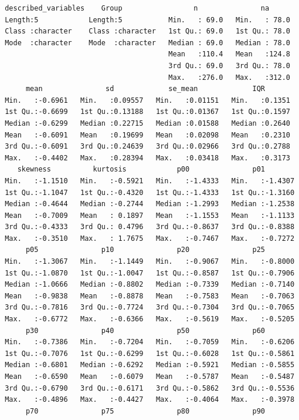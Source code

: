 \documentclass[
  letterpaper,
  DIV=11,
  numbers=noendperiod]{scrreprt}
\begin{document}
\begin{verbatim}
 described_variables    Group                 n               na       
 Length:5            Length:5           Min.   : 69.0   Min.   : 78.0  
 Class :character    Class :character   1st Qu.: 69.0   1st Qu.: 78.0  
 Mode  :character    Mode  :character   Median : 69.0   Median : 78.0  
                                        Mean   :110.4   Mean   :124.8  
                                        3rd Qu.: 69.0   3rd Qu.: 78.0  
                                        Max.   :276.0   Max.   :312.0  
      mean               sd             se_mean             IQR        
 Min.   :-0.6961   Min.   :0.09557   Min.   :0.01151   Min.   :0.1351  
 1st Qu.:-0.6699   1st Qu.:0.13188   1st Qu.:0.01367   1st Qu.:0.1597  
 Median :-0.6299   Median :0.22715   Median :0.01588   Median :0.2640  
 Mean   :-0.6091   Mean   :0.19699   Mean   :0.02098   Mean   :0.2310  
 3rd Qu.:-0.6091   3rd Qu.:0.24639   3rd Qu.:0.02966   3rd Qu.:0.2788  
 Max.   :-0.4402   Max.   :0.28394   Max.   :0.03418   Max.   :0.3173  
    skewness          kurtosis            p00               p01         
 Min.   :-1.1510   Min.   :-0.5921   Min.   :-1.4333   Min.   :-1.4307  
 1st Qu.:-1.1047   1st Qu.:-0.4320   1st Qu.:-1.4333   1st Qu.:-1.3160  
 Median :-0.4644   Median :-0.2744   Median :-1.2993   Median :-1.2538  
 Mean   :-0.7009   Mean   : 0.1897   Mean   :-1.1553   Mean   :-1.1133  
 3rd Qu.:-0.4333   3rd Qu.: 0.4796   3rd Qu.:-0.8637   3rd Qu.:-0.8388  
 Max.   :-0.3510   Max.   : 1.7675   Max.   :-0.7467   Max.   :-0.7272  
      p05               p10               p20               p25         
 Min.   :-1.3067   Min.   :-1.1449   Min.   :-0.9067   Min.   :-0.8000  
 1st Qu.:-1.0870   1st Qu.:-1.0047   1st Qu.:-0.8587   1st Qu.:-0.7906  
 Median :-1.0666   Median :-0.8802   Median :-0.7339   Median :-0.7140  
 Mean   :-0.9838   Mean   :-0.8878   Mean   :-0.7583   Mean   :-0.7063  
 3rd Qu.:-0.7816   3rd Qu.:-0.7724   3rd Qu.:-0.7304   3rd Qu.:-0.7065  
 Max.   :-0.6772   Max.   :-0.6366   Max.   :-0.5619   Max.   :-0.5205  
      p30               p40               p50               p60         
 Min.   :-0.7386   Min.   :-0.7204   Min.   :-0.7059   Min.   :-0.6206  
 1st Qu.:-0.7076   1st Qu.:-0.6299   1st Qu.:-0.6028   1st Qu.:-0.5861  
 Median :-0.6801   Median :-0.6292   Median :-0.5921   Median :-0.5855  
 Mean   :-0.6590   Mean   :-0.6079   Mean   :-0.5787   Mean   :-0.5487  
 3rd Qu.:-0.6790   3rd Qu.:-0.6171   3rd Qu.:-0.5862   3rd Qu.:-0.5536  
 Max.   :-0.4896   Max.   :-0.4427   Max.   :-0.4064   Max.   :-0.3978  
      p70               p75               p80               p90         

\end{verbatim}
\end{document}
